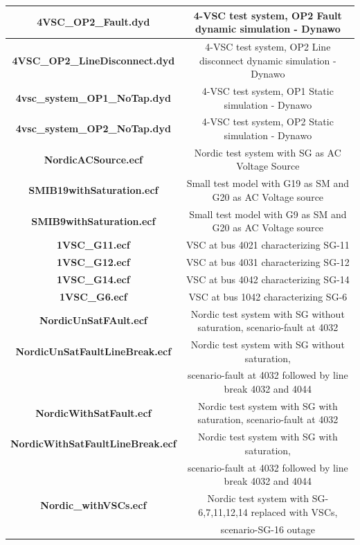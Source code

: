 \documentclass{report}
\begin{document}
\begin{table}[H]
\begin{tabular}{|c|c|}
         \textbf{4VSC\_OP2\_Fault.dyd} & 4-VSC test system, OP2 Fault dynamic simulation - Dynawo\\
         \hline 
         \textbf{4VSC\_OP2\_LineDisconnect.dyd} & 4-VSC test system, OP2 Line disconnect dynamic simulation - Dynawo\\
         \hline 
         \textbf{4vsc\_system\_OP1\_NoTap.dyd} & 4-VSC test system, OP1 Static simulation - Dynawo\\
         \hline 
         \textbf{4vsc\_system\_OP2\_NoTap.dyd} & 4-VSC test system, OP2 Static simulation - Dynawo\\
          \hline
         \textbf{NordicACSource.ecf} & Nordic test system with SG  as AC Voltage Source \\
         \hline
     \textbf{SMIB19withSaturation.ecf} & Small test model with G19 as SM and G20 as AC Voltage source  \\
          \hline
     \textbf{SMIB9withSaturation.ecf} & Small test model with G9 as SM and G20 as AC Voltage source  \\
          \hline
          \textbf{1VSC\_G11.ecf} & VSC at bus 4021 characterizing SG-11 \\
          \hline
             \textbf{1VSC\_G12.ecf} & VSC at bus 4031 characterizing SG-12 \\
          \hline
           \textbf{1VSC\_G14.ecf} & VSC at bus 4042 characterizing SG-14 \\
           \hline
            \textbf{1VSC\_G6.ecf} & VSC at bus 1042 characterizing SG-6 \\
            \hline
         \textbf{NordicUnSatFAult.ecf} & Nordic test system with SG without saturation, scenario-fault at 4032 \\
           \hline
\textbf{NordicUnSatFaultLineBreak.ecf} & Nordic test system with SG without saturation,\\
&scenario-fault at 4032 followed by line break 4032 and 4044 \\
         \hline \textbf{NordicWithSatFault.ecf} & Nordic test system with SG with saturation, scenario-fault at 4032 \\
           \hline
\textbf{NordicWithSatFaultLineBreak.ecf} & Nordic test system with SG with saturation,\\
& scenario-fault at 4032 followed by line break 4032 and 4044 \\
         \hline 
    \textbf{Nordic\_withVSCs.ecf} & Nordic test system with SG- 6,7,11,12,14 replaced with VSCs,\\ & scenario-SG-16 outage \\
           \hline
    \end{tabular}
   
    \label{tab:my_label}
\end{table}
\printbibliography

\vspace{12pt}
\end{document}
